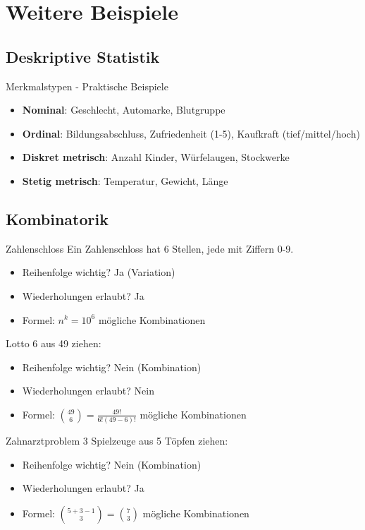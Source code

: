 \section{Weitere Beispiele}

\subsection{Deskriptive Statistik}

\begin{example2}{Merkmalstypen - Praktische Beispiele}
\begin{itemize}
    \item \textbf{Nominal}: Geschlecht, Automarke, Blutgruppe
    \item \textbf{Ordinal}: Bildungsabschluss, Zufriedenheit (1-5), Kaufkraft (tief/mittel/hoch)
    \item \textbf{Diskret metrisch}: Anzahl Kinder, Würfelaugen, Stockwerke
    \item \textbf{Stetig metrisch}: Temperatur, Gewicht, Länge
\end{itemize}
\end{example2}

\subsection{Kombinatorik}

\begin{example2}{Zahlenschloss}
Ein Zahlenschloss hat 6 Stellen, jede mit Ziffern 0-9.
\begin{itemize}
\item Reihenfolge wichtig? Ja (Variation)
\item Wiederholungen erlaubt? Ja
\item Formel: $n^k = 10^6$ mögliche Kombinationen
\end{itemize}
\end{example2}

\begin{example2}{Lotto}
6 aus 49 ziehen:
\begin{itemize}
\item Reihenfolge wichtig? Nein (Kombination)
\item Wiederholungen erlaubt? Nein
\item Formel: $\binom{49}{6} = \frac{49!}{6!(49-6)!}$ mögliche Kombinationen
\end{itemize}
\end{example2}

\begin{example2}{Zahnarztproblem}
3 Spielzeuge aus 5 Töpfen ziehen:
\begin{itemize}
\item Reihenfolge wichtig? Nein (Kombination)
\item Wiederholungen erlaubt? Ja
\item Formel: $\binom{5+3-1}{3} = \binom{7}{3}$ mögliche Kombinationen
\end{itemize}
\end{example2}


